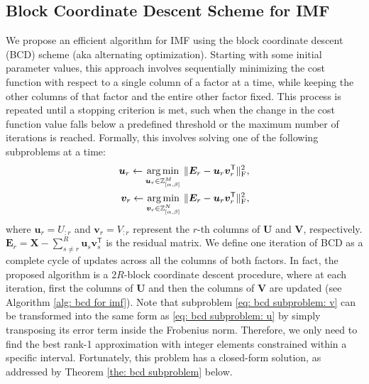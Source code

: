 \subsection{Block Coordinate Descent Scheme for IMF} \label{sec: bcd}

We propose an efficient algorithm for IMF using the block coordinate descent (BCD) scheme (aka alternating optimization). Starting with some initial parameter values, this approach involves sequentially minimizing the cost function with respect to a single column of a factor at a time, while keeping the other columns of that factor and the entire other factor fixed. This process is repeated until a stopping criterion is met, such when the change in the cost function value falls below a predefined threshold or the maximum number of iterations is reached. Formally, this involves solving one of the following subproblems at a time:
\begin{align}  
	\bm{u}_r \gets \underset{\bm{u}_r \in \mathbb{Z}_{[\alpha,\beta]}^M}{\operatorname*{arg\,min}} \ \lVert \bm{E}_r - \bm{u}_r \bm{v}_r^\mathsf{T} \rVert_\text{F}^2, \label{eq: bcd subproblem: u} \\
	\bm{v}_r \gets \underset{\bm{v}_r \in \mathbb{Z}_{[\alpha,\beta]}^N}{\operatorname*{arg\,min}} \ \lVert \bm{E}_r - \bm{u}_r \bm{v}_r^\mathsf{T} \rVert_\text{F}^2, \label{eq: bcd subproblem: v}
\end{align}
where $\bm{u}_r = U_{:r}$ and $\bm{v}_r = V_{:r}$ represent the $r$-th columns of $\bm{U}$ and $\bm{V}$, respectively. $\bm{E}_r = \bm{X} - \sum_{s \neq r}^{R} \bm{u}_s \bm{v}_s^\mathsf{T}$ is the residual matrix. We define one iteration of BCD as a complete cycle of updates across all the columns of both factors. In fact, the proposed algorithm is a $2R$-block coordinate descent procedure, where at each iteration, first the columns of $\bm{U}$ and then the columns of $\bm{V}$ are updated (see Algorithm \ref{alg: bcd for imf}). Note that subproblem \eqref{eq: bcd subproblem: v} can be transformed into the same form as \eqref{eq: bcd subproblem: u} by simply transposing its error term inside the Frobenius norm. Therefore, we only need to find the best rank-1 approximation with integer elements constrained within a specific interval. Fortunately, this problem has a closed-form solution, as addressed by Theorem \ref{the: bcd subproblem} below.

